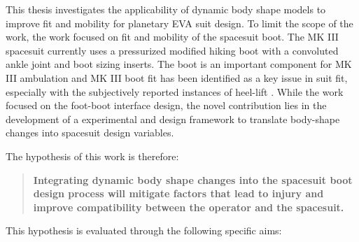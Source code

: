 \documentclass[defaultstyle,11pt]{thesis}
\begin{document}
This thesis investigates the applicability of dynamic body shape models to improve fit and mobility for planetary EVA suit design.
To limit the scope of the work, the work focused on fit and mobility of the spacesuit boot.
The MK III spacesuit currently uses a pressurized modified hiking boot with a convoluted ankle joint and boot sizing inserts.
The boot is an important component for MK III ambulation and MK III boot fit has been identified as a key issue in suit fit, especially with the subjectively reported instances of heel-lift \citep{Fineman2018}.
While the work focused on the foot-boot interface design, the novel contribution lies in the development of a experimental and design framework to translate body-shape changes into spacesuit design variables.

The hypothesis of this work is therefore:

\begin{quote}
\textbf{Integrating dynamic body shape changes into the spacesuit boot design process will mitigate factors that lead to injury and improve compatibility between the operator and the spacesuit.}
\end{quote}

This hypothesis is evaluated through the following specific aims:
\end{document}
